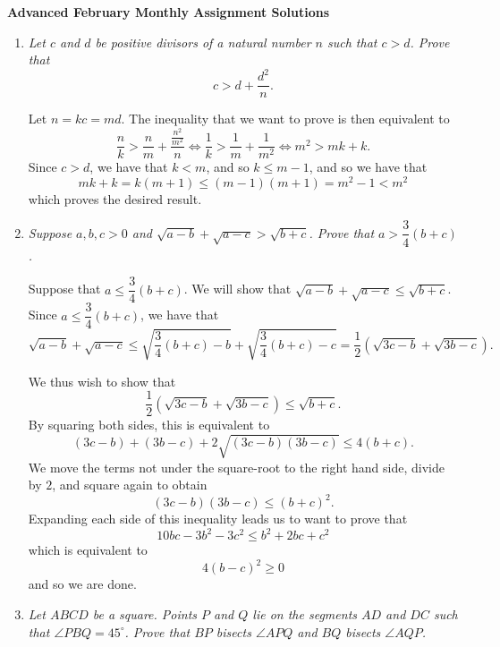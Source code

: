 \documentclass{article}
\begin{document}
\thispagestyle{empty}

\begin{center}
  \textbf{\Large Advanced February Monthly Assignment Solutions}
\end{center}

\vspace{12pt}

\begin{enumerate}[1.]

\vspace{24pt}
\item %
{\itshape Let $c$ and $d$ be positive divisors of a natural number $n$ such that $c > d$. Prove that $$c > d + \frac{d^2}{n}.$$}

Let $n = kc = md$. The inequality that we want to prove is then equivalent to
\[
	\frac{n}{k} > \frac{n}{m} + \frac{\frac{n^2}{m^2}}{n} \iff \frac{1}{k} > \frac{1}{m} + \frac{1}{m^2} \iff m^2 > mk + k.
\]
Since $c > d$, we have that $k < m$, and so $k \leq m - 1$, and so we have that
\[
	mk + k = k(m + 1) \leq (m - 1)(m + 1) = m^2 - 1 < m^2
\]
which proves the desired result.


\vspace{24pt}
\item %
{\itshape Suppose $a,b,c > 0$ and $\sqrt{a-b} +\sqrt{a-c} > \sqrt{b+c}$. Prove that $a > \dfrac{3}{4} (b+c)$.}

Suppose that $a \leq \dfrac{3}{4} (b + c)$. We will show that $\sqrt{a-b} +\sqrt{a-c} \leq \sqrt{b+c}$. Since $a \leq \dfrac{3}{4} (b + c)$, we have that
\[
	\sqrt{a-b} +\sqrt{a-c} \leq \sqrt{\frac{3}{4}(b + c) - b} + \sqrt{\frac{3}{4}(b + c) - c} = \frac{1}{2} \left(\sqrt{3c - b} + \sqrt{3b - c}\right).
\]

We thus wish to show that
\[
	\dfrac{1}{2} \left(\sqrt{3c - b} + \sqrt{3b - c}\right)  \leq \sqrt{b + c}.
\]
By squaring both sides, this is equivalent to
\[
	(3c - b) + (3b - c) + 2\sqrt{(3c - b)(3b - c)}  \leq 4(b + c).
\]
We move the terms not under the square-root to the right hand side, divide by $2$, and square again to obtain
\[
	(3c - b)(3b - c) \leq (b + c)^2.
\]
Expanding each side of this inequality leads us to want to prove that
\[
	10bc - 3b^2 - 3c^2 \leq b^2 + 2bc + c^2
\]
which is equivalent to
\[
	4(b - c)^2 \geq 0
\]
and so we are done.


\vspace{24pt}
\item %
{\itshape Let $ABCD$ be a square.
Points $P$ and $Q$ lie on the segments $AD$ and $DC$ such that $\angle PBQ = 45^\circ$.
Prove that $BP$ bisects $\angle APQ$ and $BQ$ bisects $\angle AQP$.}


\end{enumerate}
\end{document}
